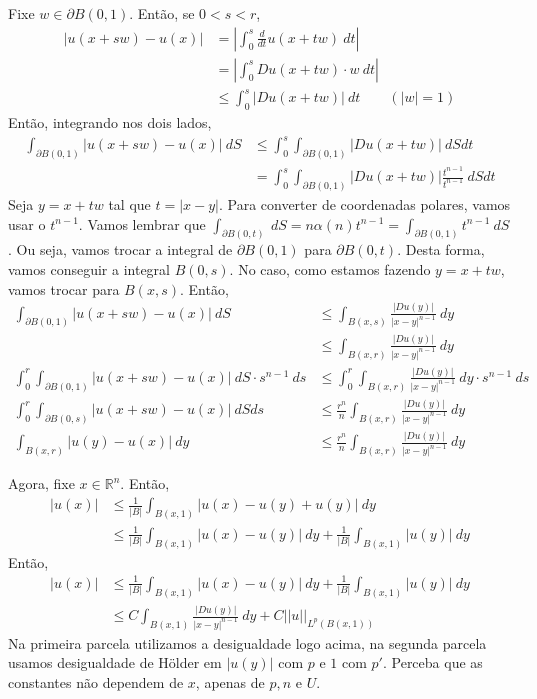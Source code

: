 \documentclass[a4paper, 11pt]{article}
\newcommand{\Rn}{{\mathbb{R}^n}}
\newcommand{\p}{\partial}
\begin{document}
Fixe $w \in \p B(0,1)$. Então, se $0 < s < r$, \begin{align*}
	| u(x+sw) - u(x) | &= \left| \int_0^s \frac{d}{dt}u(x + tw)\ dt \right| \\
	&= \left| \int_0^s Du(x+tw)\cdot w \ dt\right| \\
	& \leq \int_0^s \left| Du(x+tw) \right| \ dt \qquad (|w|=1)
\end{align*} Então, integrando nos dois lados,
\begin{align*}
	\int_{\p B(0,1)} | u(x+sw) - u(x) |\ dS &\leq \int_0^s \int_{\p B(0,1)}  \left| Du(x+tw) \right| \ dS dt \\
	&= \int_0^s \int_{\p B(0,1)}  \left| Du(x+tw) \right| \frac{t^{n-1}}{t^{n-1}} \ dS dt 
\end{align*} Seja $y=x+tw$ tal que $t = |x-y|$. Para converter de coordenadas polares, vamos usar o $t^{n-1}$. Vamos lembrar que $\int_{\p B(0,t)}\ dS = n \alpha(n) t^{n-1} = \int_{\p B(0,1)} t^{n-1}\ dS$. Ou seja, vamos trocar a integral de $\p B(0,1)$ para $\p B(0,t)$. Desta forma, vamos conseguir a integral $B(0,s)$. No caso, como estamos fazendo $y=x+tw$, vamos trocar para $B(x,s)$. Então, \begin{align*}
\int_{\p B(0,1)} | u(x+sw) - u(x) |\ dS &\leq \int_{B(x,s)} \frac{|Du(y)|}{|x-y|^{n-1}}\ dy \\
&\leq \int_{B(x,r)} \frac{|Du(y)|}{|x-y|^{n-1}}\ dy \\
\int_0^r \int_{\p B(0,1)} | u(x+sw) - u(x) |\ dS \cdot s^{n-1}\ ds &\leq \int_0^r \int_{B(x,r)} \frac{|Du(y)|}{|x-y|^{n-1}}\ dy \cdot s^{n-1}\ ds\\
\int_0^r \int_{\p B(0,s)} | u(x+sw) - u(x) |\ dS ds &\leq \frac{r^n}{n} \int_{B(x,r)} \frac{|Du(y)|}{|x-y|^{n-1}}\ dy  \\
\int_{ B(x,r)} | u(y) - u(x) |\ dy &\leq \frac{r^n}{n} \int_{B(x,r)} \frac{|Du(y)|}{|x-y|^{n-1}}\ dy 
\end{align*}

Agora, fixe $x \in \Rn$. Então, \begin{align*}
	|u(x)| &  \leq \frac{1}{|B|}\int_{B(x,1)}|u(x) - u(y) + u(y)| \ dy \\
	  &\leq \frac{1}{|B|}\int_{B(x,1)} |u(x) - u(y)| \ dy + \frac{1}{|B|}\int_{B(x,1)}| u(y) |\ dy 
\end{align*}
Então, \begin{align*}
	|u(x)| &\leq \frac{1}{|B|}\int_{B(x,1)} |u(x) - u(y)| \ dy + \frac{1}{|B|}\int_{B(x,1)}| u(y) |\ dy \\
	&\leq C\int_{B(x,1)} \frac{|Du(y)|}{|x-y|^{n-1}}\ dy + C ||u||_{L^p(B(x,1))}
\end{align*}
Na primeira parcela utilizamos a desigualdade logo acima, na segunda parcela usamos desigualdade de Hölder em $|u(y)|$ com $p$ e $1$ com $p'$. Perceba que as constantes não dependem de $x$, apenas de $p, n$ e $U$.
\end{document}
